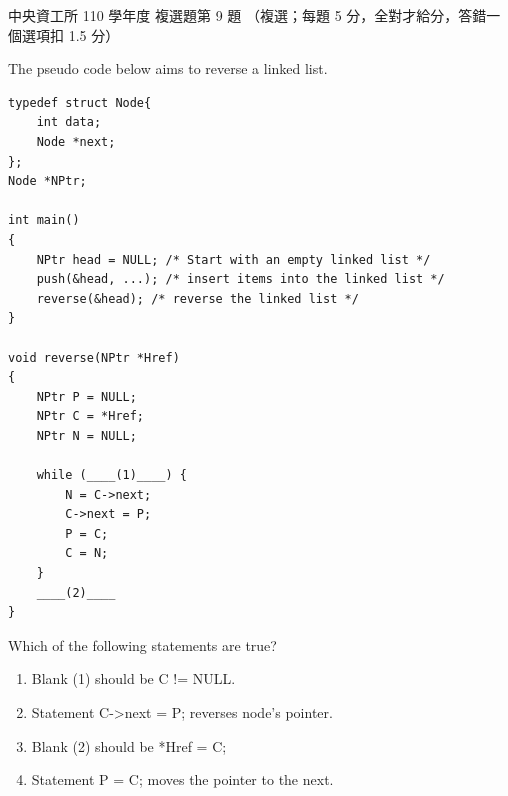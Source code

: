 \begin{pastexam}[label={px:ncu-110-dsa-09}]{中央資工所 110 學年度 複選題第 9 題}
（複選；每題 5 分，全對才給分，答錯一個選項扣 1.5 分）

The pseudo code below aims to reverse a linked list.
\begin{verbatim}
typedef struct Node{
    int data;
    Node *next;
};
Node *NPtr;

int main()
{
    NPtr head = NULL; /* Start with an empty linked list */
    push(&head, ...); /* insert items into the linked list */
    reverse(&head); /* reverse the linked list */
}

void reverse(NPtr *Href)
{
    NPtr P = NULL;
    NPtr C = *Href;
    NPtr N = NULL;

    while (____(1)____) {
        N = C->next;
        C->next = P;
        P = C;
        C = N;
    }
    ____(2)____
}
\end{verbatim}
Which of the following statements are true?
\begin{enumerate}[label=(\Alph*)]
\item Blank (1) should be C != NULL.
\item Statement C->next = P; reverses node's pointer.
\item Blank (2) should be *Href = C;
\item Statement P = C; moves the pointer to the next.
\end{enumerate}
\end{pastexam}

